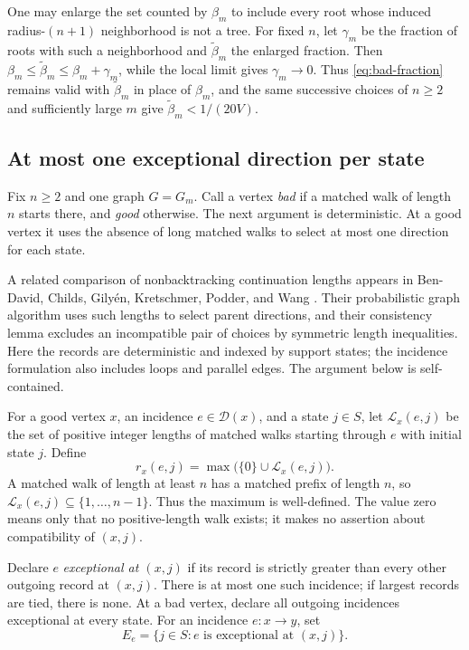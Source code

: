 \begin{remark}\label{rem:non-tree-bad-set}
One may enlarge the set counted by $\beta_m$ to include every root whose
induced radius-$(n+1)$ neighborhood is not a tree. For fixed $n$, let
$\gamma_m$ be the fraction of roots with such a neighborhood and
$\widetilde\beta_m$ the enlarged fraction. Then
$\beta_m\le\widetilde\beta_m\le\beta_m+\gamma_m$, while the local limit
gives $\gamma_m\to0$. Thus \eqref{eq:bad-fraction} remains valid with
$\widetilde\beta_m$ in place of $\beta_m$, and the same successive choices
of $n\ge2$ and sufficiently large $m$ give
$\widetilde\beta_m<1/(20V)$.
\end{remark}

\subsection{At most one exceptional direction per state}

Fix $n\ge2$ and one graph $G=G_m$. Call a vertex \emph{bad} if a
matched walk of length $n$ starts there, and \emph{good} otherwise.
The next argument is deterministic. At a good vertex it uses the
absence of long matched walks to select at most one direction for
each state.

A related comparison of nonbacktracking continuation lengths appears in
Ben-David, Childs, Gily\'en, Kretschmer, Podder, and Wang
\cite[\S6.1.2, Algorithm~6.1 and Lemma~6.3]{BenDavidEtAl24}. Their
probabilistic graph algorithm uses such lengths to select parent directions,
and their consistency lemma excludes an incompatible pair of choices by
symmetric length inequalities. Here the
records are deterministic and indexed by support states; the incidence
formulation also includes loops and parallel edges. The argument below is
self-contained.

For a good vertex $x$, an incidence $e\in\mathcal D(x)$, and a
state $j\in S$, let $\mathcal L_x(e,j)$ be the set of positive integer
lengths of matched walks starting through $e$ with initial state $j$.
Define
\[
 r_x(e,j)=\max\bigl(\{0\}\cup\mathcal L_x(e,j)\bigr).
\]
A matched walk of length at least $n$
has a matched prefix of length $n$, so
$\mathcal L_x(e,j)\subseteq\{1,\ldots,n-1\}$. Thus the maximum is
well-defined. The value zero means only that no positive-length walk
exists; it makes no assertion about compatibility of $(x,j)$.

Declare $e$ \emph{exceptional at $(x,j)$} if its record is strictly
greater than every other outgoing record at $(x,j)$. There is at most
one such incidence; if largest records are tied, there is none. At a
bad vertex, declare all outgoing incidences exceptional at every state.
For an incidence $e:x\to y$, set
\[
 E_e=\{j\in S:e\text{ is exceptional at }(x,j)\}.
\]

